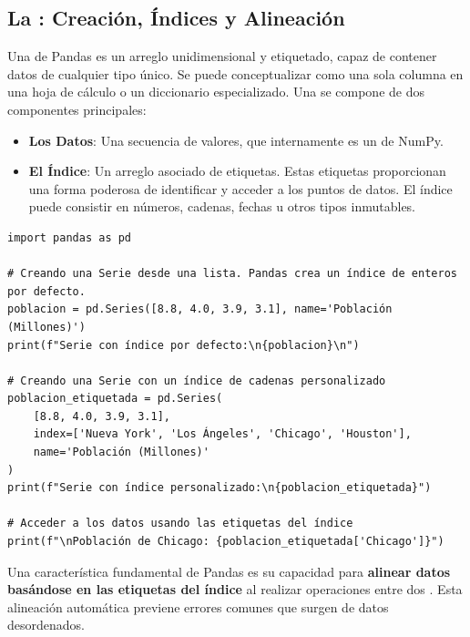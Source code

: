\subsection{La : Creación, Índices y Alineación}
\label{subsec:pandas_series}
Una  de Pandas es un arreglo unidimensional y etiquetado, capaz de contener datos de cualquier tipo único. Se puede conceptualizar como una sola columna en una hoja de cálculo o un diccionario especializado. Una  se compone de dos componentes principales:
\begin{itemize}
    \item \textbf{Los Datos}: Una secuencia de valores, que internamente es un  de NumPy.
    \item \textbf{El Índice}: Un arreglo asociado de etiquetas. Estas etiquetas proporcionan una forma poderosa de identificar y acceder a los puntos de datos. El índice puede consistir en números, cadenas, fechas u otros tipos inmutables.
\end{itemize}

\text{ }\begin{verbatim}
import pandas as pd

# Creando una Serie desde una lista. Pandas crea un índice de enteros por defecto.
poblacion = pd.Series([8.8, 4.0, 3.9, 3.1], name='Población (Millones)')
print(f"Serie con índice por defecto:\n{poblacion}\n")

# Creando una Serie con un índice de cadenas personalizado
poblacion_etiquetada = pd.Series(
    [8.8, 4.0, 3.9, 3.1],
    index=['Nueva York', 'Los Ángeles', 'Chicago', 'Houston'],
    name='Población (Millones)'
)
print(f"Serie con índice personalizado:\n{poblacion_etiquetada}")

# Acceder a los datos usando las etiquetas del índice
print(f"\nPoblación de Chicago: {poblacion_etiquetada['Chicago']}")
\end{verbatim}

Una característica fundamental de Pandas es su capacidad para \textbf{alinear datos basándose en las etiquetas del índice} al realizar operaciones entre dos . Esta alineación automática previene errores comunes que surgen de datos desordenados.

